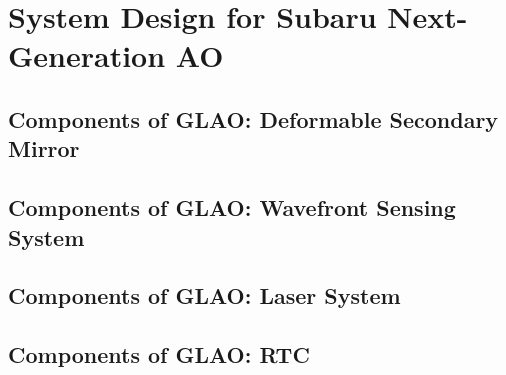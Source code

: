 


\def\thisdir{development/design/}

%

\chapter{System Design for Subaru Next-Generation AO
\label{chap:system_design}}





\section{Components of GLAO: Deformable Secondary Mirror}

\section{Components of GLAO: Wavefront Sensing System}

\section{Components of GLAO: Laser System}

\section{Components of GLAO: RTC}


%
